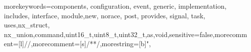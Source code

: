 \newenvironment{denselist}[1][可改变的列表题目]{%
\begin{list}{\textbf{\hei #1} \arabic{newlist}：} %
    {
    \usecounter{newlist}
     \setlength{\labelwidth}{22pt} %
     \setlength{\labelsep}{0cm} %
     \setlength{\leftmargin}{0cm} %
     \setlength{\rightmargin}{0cm}
     \setlength{\parsep}{0ex} %
     \setlength{\itemsep}{0ex} %
     \setlength{\itemindent}{44pt} %
     \setlength{\listparindent}{22pt} %
    }}
{\end{list}}%

\newcommand{\chref}[1]{\CJKnumber{\ref{#1}}}
\newcommand{\KH}[1]{\!\!（#1）\!\!}
\newcommand\dlmu@underline[2][5cm]{\hskip1pt\underline{\hb@xt@ #1{\hss#2\hss}}\hskip3pt}
\let\coverunderline\dlmu@underline

\setlength{\parindent}{2em}
\renewcommand{\lstlistingname}{\wuhao 源码}

\setlength{\headheight}{24pt}

\newfontfamily{}
\newfontfamily{}
\newfontfamily{}

  {morekeywords={components, configuration, event, generic, implementation, includes, interface, module,new, norace, post, provides, signal, task, uses,nx\_struct, nx\_union,command,uint16\_t,uint8\_t,uint32\_t,as,void},sensitive=false,morecomment=[l]{//},morecomment=[s]{/*}{*/},morestring=[b]",}


\renewcommand\arraystretch{1.25}
